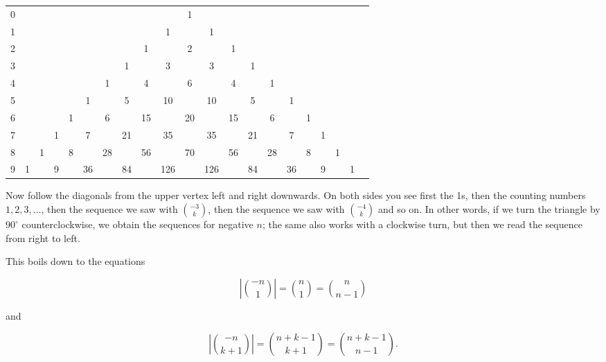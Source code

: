 \documentclass[tikz]{scrreprt}
\begin{document}
\begin{tabular}{l c c c c c c c c c c c c c c c c c c c c}
0 &   &   &   &   &    &    &    &    &     &  1 &     &    &    &    &    &   &   &   &   &  \\
1 &   &   &   &   &    &    &    &    &   1 &    &   1 &    &    &    &    &   &   &   &   &  \\
2 &   &   &   &   &    &    &    &  1 &     &  2 &     &  1 &    &    &    &   &   &   &   &  \\
3 &   &   &   &   &    &    &  1 &    &   3 &    &   3 &    &  1 &    &    &   &   &   &   &  \\
4 &   &   &   &   &    &  1 &    &  4 &     &  6 &     &  4 &    &  1 &    &   &   &   &   &  \\
5 &   &   &   &   &  1 &    &  5 &    &  10 &    &  10 &    &  5 &    &  1 &   &   &   &   &  \\   
6 &   &   &   & 1 &    &  6 &    & 15 &     & 20 &     & 15 &    &  6 &    & 1 &   &   &   &  \\
7 &   &   & 1 &   &  7 &    & 21 &    &  35 &    &  35 &    & 21 &    &  7 &   & 1 &   &   &  \\
8 &   & 1 &   & 8 &    & 28 &    & 56 &     & 70 &     & 56 &    & 28 &    & 8 &   & 1 &   & \\
9 & 1 &   & 9 &   & 36 &    & 84 &    & 126 &    & 126 &    & 84 &    & 36 &   & 9 &   & 1
\end{tabular}

Now follow the diagonals from the upper vertex
left and right downwards.
On both sides you see first the 1s,
then the counting numbers $1,2,3,\dots$,
then the sequence we saw with $\binom{-3}{k}$,
then the sequence we saw with $\binom{-4}{k}$
and so on.
In other words, if we turn the triangle
by $90^{\circ}$ counterclockwise, 
we obtain the sequences for negative $n$;
the same also works with a clockwise turn,
but then we read the sequence from right to left.

This boils down to the equations

\begin{equation}\label{eq:NegPos_1}
\left\lvert\binom{-n}{1}\right\rvert 
= \binom{n}{1}
= \binom{n}{n-1}
\end{equation}

and

\begin{equation}\label{eq:NegPos_k}
\left\lvert\binom{-n}{k+1}\right\rvert 
= \binom{n+k-1}{k+1}
= \binom{n+k-1}{n-1}.
\end{equation}
\end{document}
